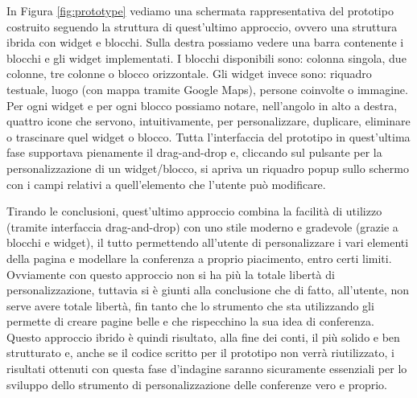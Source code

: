        	In Figura \ref{fig:prototype} vediamo una schermata rappresentativa del prototipo costruito seguendo la struttura di quest'ultimo approccio, ovvero una struttura ibrida con widget e blocchi. Sulla destra possiamo vedere una barra contenente i blocchi e gli widget implementati. I blocchi disponibili sono: colonna singola, due colonne, tre colonne o blocco orizzontale. Gli widget invece sono: riquadro testuale, luogo (con mappa tramite Google Maps), persone coinvolte o immagine. Per ogni widget e per ogni blocco possiamo notare, nell'angolo in alto a destra, quattro icone che servono, intuitivamente, per personalizzare, duplicare, eliminare o trascinare quel widget o blocco. Tutta l'interfaccia del prototipo in quest'ultima fase supportava pienamente il drag-and-drop e, cliccando sul pulsante per la personalizzazione di un widget/blocco, si apriva un riquadro popup sullo schermo con i campi relativi a quell'elemento che l'utente può modificare.
       	
       	Tirando le conclusioni, quest'ultimo approccio combina la facilità di utilizzo (tramite interfaccia drag-and-drop) con uno stile moderno e gradevole (grazie a blocchi e widget), il tutto permettendo all'utente di personalizzare i vari elementi della pagina e modellare la conferenza a proprio piacimento, entro certi limiti. Ovviamente con questo approccio non si ha più la totale libertà di personalizzazione, tuttavia si è giunti alla conclusione che di fatto, all'utente, non serve avere totale libertà, fin tanto che lo strumento che sta utilizzando gli permette di creare pagine belle e che rispecchino la sua idea di conferenza. Questo approccio ibrido è quindi risultato, alla fine dei conti, il più solido e ben strutturato e, anche se il codice scritto per il prototipo non verrà riutilizzato, i risultati ottenuti con questa fase d'indagine saranno sicuramente essenziali per lo sviluppo dello strumento di personalizzazione delle conferenze vero e proprio.
